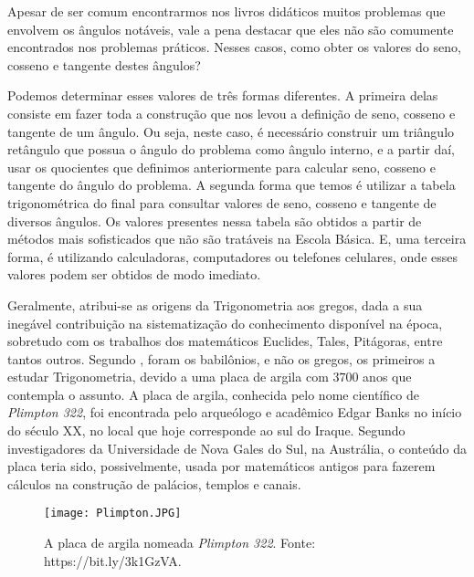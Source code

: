 Apesar de ser comum encontrarmos nos livros didáticos muitos problemas que envolvem os ângulos notáveis, vale a pena destacar que eles não são comumente encontrados nos problemas práticos. Nesses casos, como obter os valores do seno, cosseno e tangente destes ângulos? 

Podemos  determinar esses valores de três formas diferentes. A primeira delas consiste em fazer toda a construção que nos levou a definição de seno, cosseno e tangente de um ângulo. Ou seja, neste caso, é necessário construir um triângulo retângulo que possua o ângulo do problema como ângulo interno, e a partir daí, usar os quocientes que definimos anteriormente para calcular seno, cosseno e tangente do ângulo do problema. A segunda forma que temos é utilizar a tabela trigonométrica do final para consultar valores de seno, cosseno e tangente de diversos ângulos. Os valores presentes nessa tabela são obtidos a partir de métodos mais sofisticados que não são tratáveis na Escola Básica. E, uma terceira forma, é utilizando calculadoras, computadores ou telefones celulares, onde esses valores podem ser obtidos de modo imediato.

 
 Geralmente, atribui-se as origens da Trigonometria aos gregos, dada a sua inegável contribuição na sistematização do conhecimento disponível na época, sobretudo com os trabalhos dos matemáticos Euclides, Tales, Pitágoras, entre tantos outros. Segundo \cite{mansfield2017}, foram os babilônios, e não os gregos, os primeiros a estudar Trigonometria, devido a uma placa de argila com $3700$ anos que contempla o assunto. A placa de argila, conhecida pelo nome científico de {\textit {Plimpton 322}}, foi encontrada pelo arqueólogo e acadêmico Edgar Banks no início do século XX, no local que hoje corresponde ao sul do Iraque. Segundo investigadores da Universidade de Nova Gales do Sul, na Austrália, o conteúdo da placa teria sido, possivelmente, usada por matemáticos antigos para fazerem cálculos na construção de palácios, templos e canais.
 
\begin{figure}[H]
    \centering
    \texttt{[image: Plimpton.JPG]}
    \caption{A placa de argila nomeada {\textit {Plimpton 322}}. Fonte: https://bit.ly/3k1GzVA.}
    \label{Plimpton}
\end{figure}

